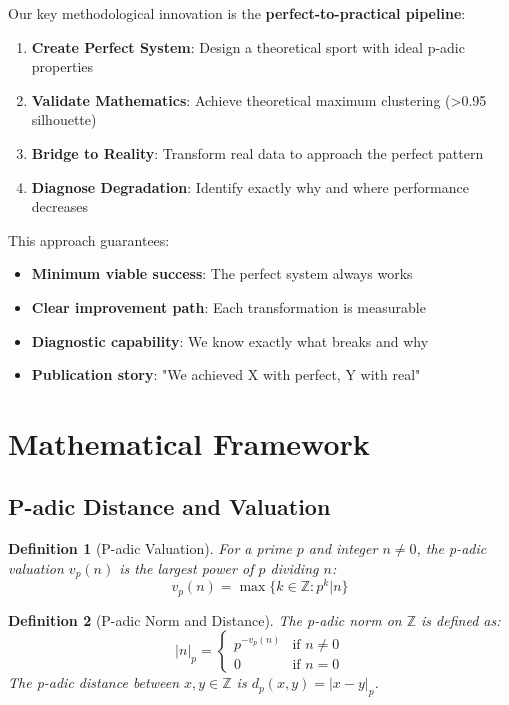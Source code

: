 \documentclass[11pt,a4paper]{article}
\newtheorem{definition}{Definition}
\newcommand{\Z}{\mathbb{Z}}
\newcommand{\padic}[2]{\lvert #1 \rvert_{#2}}
\begin{document}
Our key methodological innovation is the \textbf{perfect-to-practical pipeline}:

\begin{enumerate}
    \item \textbf{Create Perfect System}: Design a theoretical sport with ideal p-adic properties
    \item \textbf{Validate Mathematics}: Achieve theoretical maximum clustering (>0.95 silhouette)
    \item \textbf{Bridge to Reality}: Transform real data to approach the perfect pattern
    \item \textbf{Diagnose Degradation}: Identify exactly why and where performance decreases
\end{enumerate}

This approach guarantees:
\begin{itemize}
    \item \textbf{Minimum viable success}: The perfect system always works
    \item \textbf{Clear improvement path}: Each transformation is measurable
    \item \textbf{Diagnostic capability}: We know exactly what breaks and why
    \item \textbf{Publication story}: "We achieved X with perfect, Y with real"
\end{itemize}

\section{Mathematical Framework}

\subsection{P-adic Distance and Valuation}

\begin{definition}[P-adic Valuation]
For a prime $p$ and integer $n \neq 0$, the p-adic valuation $v_p(n)$ is the largest power of $p$ dividing $n$:
\[
v_p(n) = \max\{k \in \Z : p^k | n\}
\]
\end{definition}

\begin{definition}[P-adic Norm and Distance]
The p-adic norm on $\Z$ is defined as:
\[
\padic{n}{p} = \begin{cases}
    p^{-v_p(n)} & \text{if } n \neq 0 \\
    0 & \text{if } n = 0
\end{cases}
\]
The p-adic distance between $x, y \in \Z$ is $d_p(x,y) = \padic{x-y}{p}$.
\end{definition}
\end{document}
